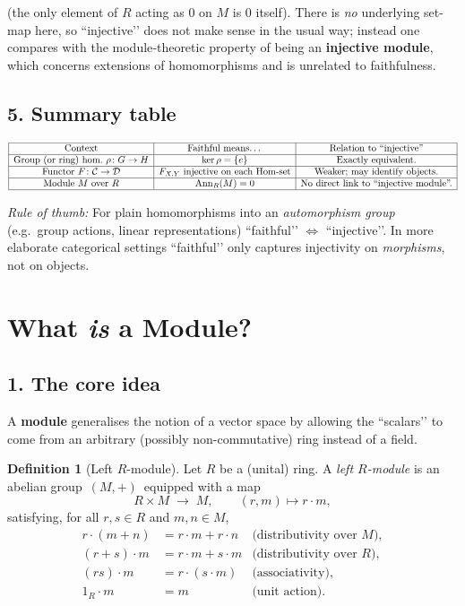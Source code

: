 \documentclass[12pt]{article}
\theoremstyle{definition} %
\newtheorem{definition}{Definition}
\theoremstyle{plain} %
\begin{document}
(the only element of \(R\) acting as \(0\) on \(M\) is \(0\) itself).
There is \emph{no} underlying set-map here, so “injective’’ does not
make sense in the usual way; instead one compares with the module‐theoretic
property of being an \textbf{injective module}, which concerns
extensions of homomorphisms and is unrelated to faithfulness.

\subsection*{5.  Summary table}

\[
\begin{array}{|c|c|c|}
\hline
\text{Context} & \text{Faithful means\ldots} & \text{Relation to ``injective''} \\
\hline
\text{Group (or ring) hom.\ } \rho\colon G\to H 
   & \ker\rho=\{e\} & \text{Exactly equivalent.}\\
\hline
\text{Functor } F\colon\mathcal{C}\to\mathcal{D}
   & F_{X,Y}\text{ injective on each Hom-set} 
   & \text{Weaker; may identify objects.}\\
\hline
\text{Module } M \text{ over } R 
   & \operatorname{Ann}_R(M)=0 & \text{No direct link to ``injective module''.}\\
\hline
\end{array}
\]

\bigskip
\noindent\emph{Rule of thumb:}  
For plain homomorphisms into an \emph{automorphism group} (e.g.\ group
actions, linear representations) “faithful’’ \(\Longleftrightarrow\)
“injective’’.  
In more elaborate categorical settings “faithful’’ only captures
injectivity on \emph{morphisms}, not on objects.
\section*{What \emph{is} a Module?}

\subsection*{1.  The core idea}

A \textbf{module} generalises the notion of a vector space by allowing
the “scalars’’ to come from an arbitrary (possibly non-commutative) ring
instead of a field.

\begin{definition}[Left $R$-module]
Let $R$ be a (unital) ring.  
A \emph{left $R$-module} is an abelian group $\,(M,+)\,$ equipped with a
map
\[
   R\times M \;\longrightarrow\; M,
   \qquad (r,m)\longmapsto r\cdot m,
\]
satisfying, for all $r,s\in R$ and $m,n\in M$,
\begin{align*}
   r\cdot(m+n)             &= r\cdot m + r\cdot n &\text{(distributivity over $M$)},\\
   (r+s)\cdot m            &= r\cdot m + s\cdot m &\text{(distributivity over $R$)},\\
   (rs)\cdot m             &= r\cdot(s\cdot m)    &\text{(associativity)},\\
   1_R\!\cdot m            &= m                   &\text{(unit action)}.
\end{align*}
\end{definition}
\end{document}
